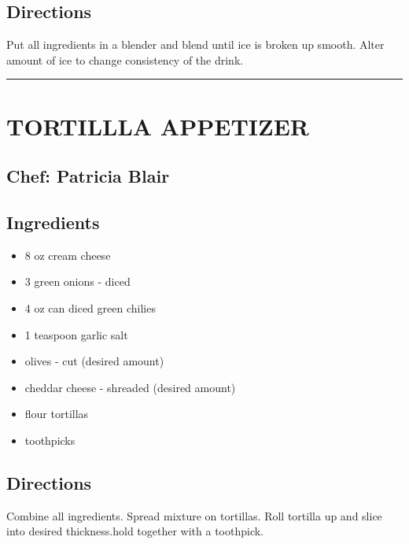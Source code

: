 \documentclass[
]{book}
\providecommand{\tightlist}{%
  \setlength{\itemsep}{0pt}\setlength{\parskip}{0pt}}
\begin{document}
\hypertarget{directions-9}{%
\subsection*{Directions}\label{directions-9}}


Put all ingredients in a blender and blend until ice is broken up smooth. Alter amount of ice to change consistency of the drink.

\begin{center}\rule{0.5\linewidth}{0.5pt}\end{center}

\hypertarget{tortillla-appetizer}{%
\section*{TORTILLLA APPETIZER}\label{tortillla-appetizer}}


\hypertarget{chef-patricia-blair-3}{%
\subsection*{Chef: Patricia Blair}\label{chef-patricia-blair-3}}


\hypertarget{ingredients-10}{%
\subsection*{Ingredients}\label{ingredients-10}}


\begin{itemize}
\tightlist
\item
  8 oz cream cheese
\item
  3 green onions - diced
\item
  4 oz can diced green chilies
\item
  1 teaspoon garlic salt
\item
  olives - cut (desired amount)
\item
  cheddar cheese - shreaded (desired amount)
\item
  flour tortillas
\item
  toothpicks
\end{itemize}

\hypertarget{directions-10}{%
\subsection*{Directions}\label{directions-10}}


Combine all ingredients. Spread mixture on tortillas. Roll tortilla up and slice into desired thickness.hold together with a toothpick.
\end{document}
